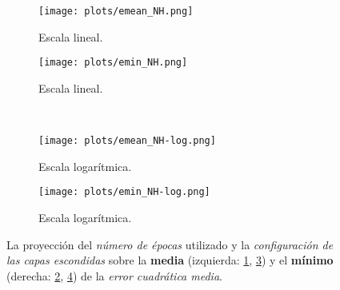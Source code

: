 \begin{figure}[h]
	\centering
	\begin{subfigure}[b]{0.49\textwidth}
        \texttt{[image: plots/emean\_NH.png]}
        \caption{Escala lineal.}
        \label{fig:emean_NH-lin}
    \end{subfigure}
	\begin{subfigure}[b]{0.49\textwidth}
        \texttt{[image: plots/emin\_NH.png]}
        \caption{Escala lineal.}
        \label{fig:emin_NH-lin}
    \end{subfigure}
    \\
	\begin{subfigure}[b]{0.49\textwidth}
        \texttt{[image: plots/emean\_NH-log.png]}
        \caption{Escala logarítmica.}
        \label{fig:emean_NH-log}
    \end{subfigure}
	\begin{subfigure}[b]{0.49\textwidth}
        \texttt{[image: plots/emin\_NH-log.png]}
        \caption{Escala logarítmica.}
        \label{fig:emin_NH-log}
    \end{subfigure}    
	
	\caption{La proyección del \emph{número de épocas} utilizado y la
			 \emph{configuración de las capas escondidas} 
			 sobre la \textbf{media} (izquierda: \ref{fig:emean_NH-lin}, \ref{fig:emean_NH-log}) 
			 y el \textbf{mínimo} (derecha: \ref{fig:emin_NH-lin}, \ref{fig:emin_NH-log})
			 de la \emph{error cuadrática media}.}
	\label{fig:NHe}
\end{figure}
	


%	

